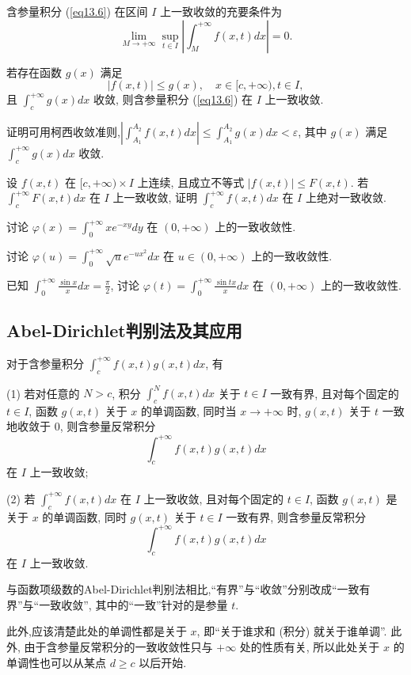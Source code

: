 \documentclass[lang=cn,newtx,10pt,scheme=chinese]{elegantbook}
\begin{document}
\begin{theorem}
含参量积分 (\ref{eq13.6}) 在区间 $I$ 上一致收敛的充要条件为
$$ \lim\limits_{M \to +\infty} \sup_{t \in I} \left| \int_{M}^{+\infty} f(x,t) dx \right| = 0. $$
\end{theorem}

\begin{theorem}
若存在函数 $g(x)$ 满足
$$ |f(x,t)| \le g(x), \quad x \in [c, +\infty), t \in I, $$
且 $\int_{c}^{+\infty} g(x) dx$ 收敛, 则含参量积分 (\ref{eq13.6}) 在 $I$ 上一致收敛.
\end{theorem}
\begin{remark}
    证明可用柯西收敛准则,$|\int_{A_1}^{A_2} f(x,t) dx| \le \int_{A_1}^{A_2} g(x) dx < \varepsilon$, 其中 $g(x)$ 满足 $\int_{c}^{+\infty} g(x) dx$ 收敛.
\end{remark}

\begin{example}
设 $f(x,t)$ 在 $[c, +\infty) \times I$ 上连续, 且成立不等式 $|f(x,t)| \le F(x,t)$. 若 $\int_{c}^{+\infty} F(x,t) dx$ 在 $I$ 上一致收敛, 证明 $\int_{c}^{+\infty} f(x,t) dx$ 在 $I$ 上绝对一致收敛.
\end{example}

\begin{example}
讨论 $\varphi(x) = \int_{0}^{+\infty} xe^{-xy} dy$ 在 $(0, +\infty)$ 上的一致收敛性.
\end{example}

\begin{example}
讨论 $\varphi(u) = \int_{0}^{+\infty} \sqrt{u}e^{-ux^2} dx$ 在 $u \in (0, +\infty)$ 上的一致收敛性.
\end{example}

\begin{example}
已知 $\int_{0}^{+\infty} \frac{\sin x}{x} dx = \frac{\pi}{2}$, 讨论 $\varphi(t) = \int_{0}^{+\infty} \frac{\sin tx}{x} dx$ 在 $(0, +\infty)$ 上的一致收敛性.
\end{example}

\subsection{Abel-Dirichlet判别法及其应用}

\begin{theorem}
对于含参量积分 $\int_{c}^{+\infty} f(x,t) g(x,t) dx$, 有

(1) 若对任意的 $N > c$, 积分 $\int_{c}^{N} f(x,t) dx$ 关于 $t \in I$ 一致有界, 且对每个固定的 $t \in I$, 函数 $g(x,t)$ 关于 $x$ 的单调函数, 同时当 $x \to +\infty$ 时, $g(x,t)$ 关于 $t$ 一致地收敛于 0, 则含参量反常积分
$$ \int_{c}^{+\infty} f(x,t) g(x,t) dx $$
在 $I$ 上一致收敛;

(2) 若 $\int_{c}^{+\infty} f(x,t) dx$ 在 $I$ 上一致收敛, 且对每个固定的 $t \in I$, 函数 $g(x,t)$ 是关于 $x$ 的单调函数, 同时 $g(x,t)$ 关于 $t \in I$ 一致有界, 则含参量反常积分
$$ \int_{c}^{+\infty} f(x,t) g(x,t) dx $$
在 $I$ 上一致收敛.
\end{theorem}

\begin{remark}
    与函数项级数的Abel-Dirichlet判别法相比,“有界”与“收敛”分别改成“一致有界”与“一致收敛”, 其中的“一致”针对的是参量 $t$. 

    此外,应该清楚此处的单调性都是关于 $x$, 即“关于谁求和 (积分) 就关于谁单调”. 此外, 由于含参量反常积分的一致收敛性只与 $+\infty$ 处的性质有关, 所以此处关于 $x$ 的单调性也可以从某点 $d \ge c$ 以后开始.
\end{remark}
\end{document}
